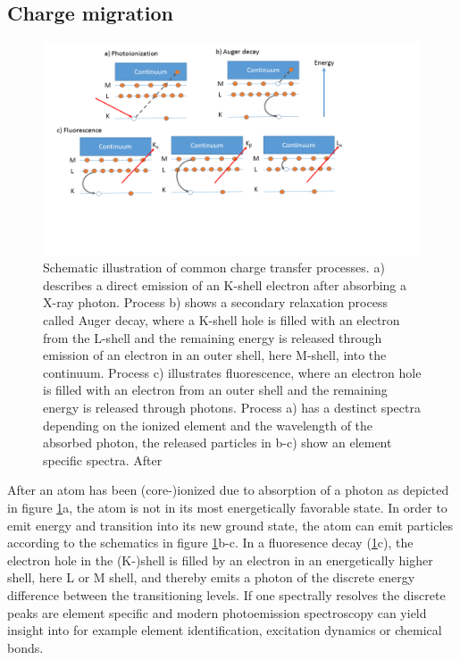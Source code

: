 \subsection{Charge migration}\label{sec:relaxation}
\begin{figure}
	\centering
		\includegraphics[width=1.00\textwidth]{images/el-relaxation.png}
	\caption[Schematic illustration of common charge transfer processes]{Schematic illustration of common charge transfer processes. a) describes a direct emission of an K-shell electron after absorbing a X-ray photon. Process b) shows a secondary relaxation process called Auger decay, where a K-shell hole is filled with an electron from the L-shell and the remaining energy is released through emission of an electron in an outer shell, here M-shell, into the continuum. Process c) illustrates fluorescence, where an electron hole is filled with an electron from an outer shell and the remaining energy is released through photons. Process a) has a destinct spectra depending on the ionized element and the wavelength of the absorbed photon, the released particles in b-c) show an element specific spectra. After \citep[][p.~19]{Als-Nielson-2011-JWS}}
	\label{fig:el-relaxation}
\end{figure}
After an atom has been (core-)ionized due to absorption of a photon as depicted in figure \ref{fig:el-relaxation}a, the atom is not in its most energetically favorable state. In order to emit energy and transition into its new ground state, the atom can emit particles according to the schematics in figure \ref{fig:el-relaxation}b-c. In a fluoresence decay (\ref{fig:el-relaxation}c), the electron hole in the (K-)shell is filled by an electron in an energetically higher shell, here L or M shell, and thereby emits a photon of the discrete energy difference between the transitioning levels. If one spectrally resolves the discrete peaks are element specific and modern photoemission spectroscopy can yield insight into for example element identification, excitation dynamics or chemical bonds.
